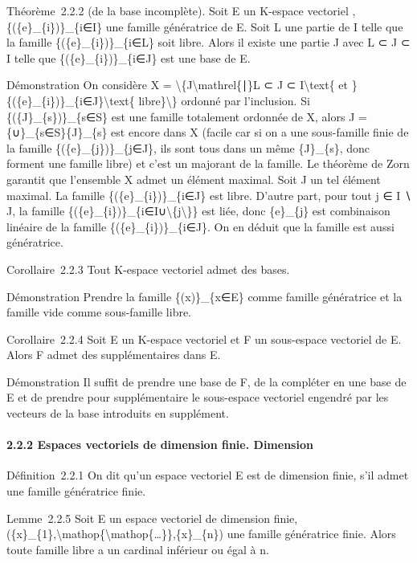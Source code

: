 \documentclass[]{article}
\begin{document}
Théorème~2.2.2 (de la base incomplète). Soit E un K-espace vectoriel ,
\{(\{e\}\_\{i\})\}\_\{i∈I\} une famille génératrice de E. Soit L une
partie de I telle que la famille \{(\{e\}\_\{i\})\}\_\{i∈L\} soit libre.
Alors il existe une partie J avec L ⊂ J ⊂ I telle que
\{(\{e\}\_\{i\})\}\_\{i∈J\} est une base de E.

Démonstration On considère X =
\textbackslash{}\{J\textbackslash{}mathrel\{∣\}L ⊂ J ⊂
I\textbackslash{}text\{ et
\}\{(\{e\}\_\{i\})\}\_\{i∈J\}\textbackslash{}text\{
libre\}\textbackslash{}\} ordonné par l'inclusion. Si
\{(\{J\}\_\{s\})\}\_\{s∈S\} est une famille totalement ordonnée de X,
alors J = \{∪\}\_\{s∈S\}\{J\}\_\{s\} est encore dans X (facile car si on
a une sous-famille finie de la famille \{(\{e\}\_\{j\})\}\_\{j∈J\}, ils
sont tous dans un même \{J\}\_\{s\}, donc forment une famille libre) et
c'est un majorant de la famille. Le théorème de Zorn garantit que
l'ensemble X admet un élément maximal. Soit J un tel élément maximal. La
famille \{(\{e\}\_\{i\})\}\_\{i∈J\} est libre. D'autre part, pour tout j
∈ I ∖ J, la famille
\{(\{e\}\_\{i\})\}\_\{i∈I∪\textbackslash{}\{j\textbackslash{}\}\} est
liée, donc \{e\}\_\{j\} est combinaison linéaire de la famille
\{(\{e\}\_\{i\})\}\_\{i∈J\}. On en déduit que la famille est aussi
génératrice.

Corollaire~2.2.3 Tout K-espace vectoriel admet des bases.

Démonstration Prendre la famille \{(x)\}\_\{x∈E\} comme famille
génératrice et la famille vide comme sous-famille libre.

Corollaire~2.2.4 Soit E un K-espace vectoriel et F un sous-espace
vectoriel de E. Alors F admet des supplémentaires dans E.

Démonstration Il suffit de prendre une base de F, de la compléter en une
base de E et de prendre pour supplémentaire le sous-espace vectoriel
engendré par les vecteurs de la base introduits en supplément.

\paragraph{2.2.2 Espaces vectoriels de dimension finie. Dimension}

Définition~2.2.1 On dit qu'un espace vectoriel E est de dimension finie,
s'il admet une famille génératrice finie.

Lemme~2.2.5 Soit E un espace vectoriel de dimension finie,
(\{x\}\_\{1\},\textbackslash{}mathop\{\textbackslash{}mathop\{\ldots{}\}\},\{x\}\_\{n\})
une famille génératrice finie. Alors toute famille libre a un cardinal
inférieur ou égal à n.
\end{document}

